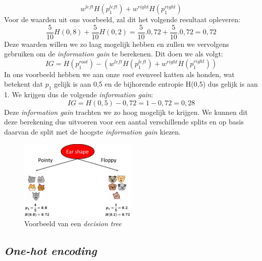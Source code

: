 \begin{equation}
	w^{left} H(p_{1}^{left}) + w^{right} H(p_{1}^{right})
\end{equation}
\noindent
Voor de waarden uit ons voorbeeld, zal dit het volgende resultaat opleveren:
\begin{equation}
	\frac{5}{10} H(0,8) + \frac{5}{10} H(0,2) = \frac{5}{10} . 0,72+ \frac{5}{10} . 0,72 = 0,72
\end{equation}
\noindent
Deze waarden willen we zo laag mogelijk hebben en zullen we vervolgens gebruiken om de \textit{information gain} te berekenen. Dit doen we als volgt:
\begin{equation}
	IG = H(p_{1}^{root}) - (w^{left} H(p_{1}^{left}) + w^{right} H(p_{1}^{right}))
\end{equation}
\noindent
In ons voorbeeld hebben we aan onze \textit{root} evenveel katten als honden, wat betekent dat $p_{1}$ gelijk is aan 0,5 en de bijhorende entropie H(0,5) dus gelijk is aan 1. We krijgen dus de volgende \textit{information gain}:
\begin{equation}
	IG = H(0,5) - 0,72 = 1 - 0,72 = 0,28
\end{equation}
\noindent
Deze \textit{information gain} trachten we zo hoog mogelijk te krijgen. We kunnen dit deze berekening dus uitvoeren voor een aantal verschillende splits en op basis daarvan de split met de hoogste \textit{information gain} kiezen. 

\begin{figure}[h]
	\centering
	\includegraphics[width=0.5\textwidth]{images/31-decision-tree-split.png}
	\caption{Voorbeeld van een \textit{decision tree}}
	\label{fig:decision-tree-split}
\end{figure}

\subsection{\textit{One-hot encoding}}

